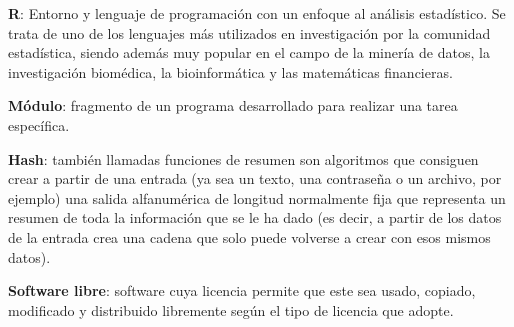 \textbf{R}: Entorno y lenguaje de programación con un enfoque al análisis estadístico. Se trata de uno de los lenguajes más utilizados en investigación por la comunidad estadística, siendo además muy popular en el campo de la minería de datos, la investigación biomédica, la bioinformática y las matemáticas financieras.
\bigskip

\textbf{Módulo}: fragmento de un programa desarrollado para realizar una tarea específica.
\bigskip

\textbf{Hash}: también llamadas funciones de resumen son algoritmos que consiguen crear a partir de una entrada (ya sea un texto, una contraseña o un archivo, por ejemplo) una salida alfanumérica de longitud normalmente fija que representa un resumen de toda la información que se le ha dado (es decir, a partir de los datos de la entrada crea una cadena que solo puede volverse a crear con esos mismos datos).
\bigskip

\textbf{Software libre}: software cuya licencia permite que este sea usado, copiado, modificado y distribuido libremente según el tipo de licencia que adopte.
\bigskip
